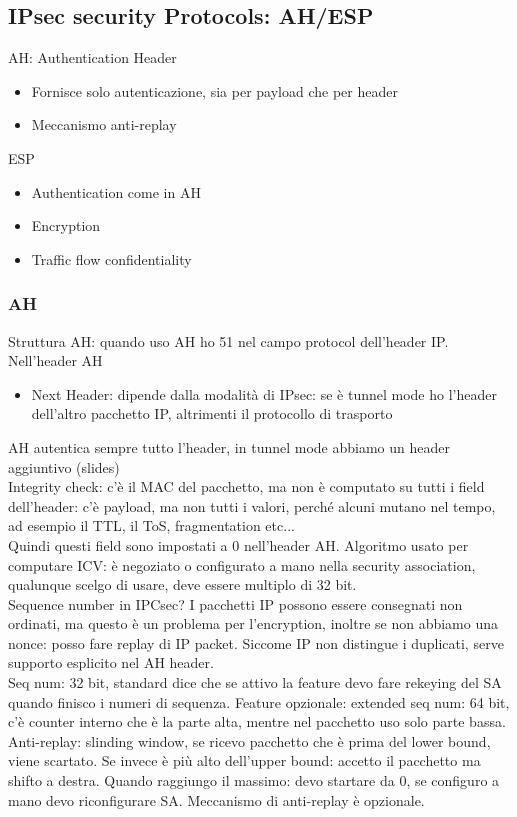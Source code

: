 \documentclass[16px]{article}
\begin{document}
\subsection{IPsec security Protocols: AH/ESP}
AH: Authentication Header
\begin{itemize}
\item Fornisce solo autenticazione, sia per payload che per header
\item Meccanismo anti-replay
\end{itemize}
ESP
\begin{itemize}
\item Authentication come in AH
\item Encryption
\item Traffic flow confidentiality
\end{itemize}
\subsubsection{AH}
Struttura AH: quando uso AH ho 51 nel campo protocol dell'header IP. Nell'header AH
\begin{itemize}
\item Next Header: dipende dalla modalità di IPsec: se è tunnel mode ho l'header dell'altro pacchetto IP, altrimenti il protocollo di trasporto
\end{itemize}
AH autentica sempre tutto l'header, in tunnel mode abbiamo un header aggiuntivo (slides)
\\
Integrity check: c'è il MAC del pacchetto, ma non è computato su tutti i field dell'header: c'è payload, ma non tutti i valori, perché alcuni mutano nel tempo, ad esempio il TTL, il ToS, fragmentation etc...\\ Quindi questi field sono impostati a 0 nell'header AH. Algoritmo usato per computare ICV: è negoziato o configurato a mano nella security association, qualunque scelgo di usare, deve essere multiplo di 32 bit.\\ Sequence number in IPCsec? I pacchetti IP possono essere consegnati non ordinati, ma questo è un problema per l'encryption, inoltre se non abbiamo una nonce: posso fare replay di IP packet. Siccome IP non distingue i duplicati, serve supporto esplicito nel AH header.\\ Seq num: 32 bit, standard dice che se attivo la feature devo fare rekeying del SA quando finisco i numeri di sequenza. Feature opzionale: extended seq num: 64 bit, c'è counter interno che è la parte alta, mentre nel pacchetto uso solo parte bassa.\\ Anti-replay: slinding window, se ricevo pacchetto che è prima del lower bound, viene scartato. Se invece è più alto dell'upper bound: accetto il pacchetto ma shifto a destra. Quando raggiungo il massimo: devo startare da 0, se configuro a mano devo riconfigurare SA. Meccanismo di anti-replay è opzionale.
\end{document}
